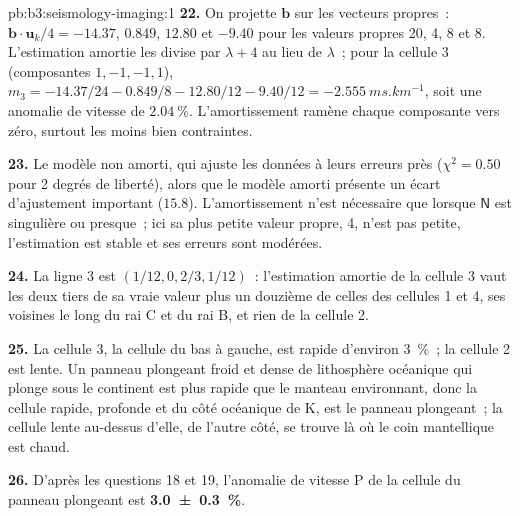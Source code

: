 \begin{solution}{pb:b3:seismology-imaging:1}
\textbf{22.} On projette $\mathbf b$ sur les vecteurs propres~: $\mathbf b\cdot\mathbf u_k/4
= -14.37$, $0.849$, $12.80$ et $-9.40$ pour les valeurs propres 20, 4, 8 et 8.
L'estimation amortie les divise par $\lambda + 4$ au lieu de $\lambda$~; pour
la cellule 3 (composantes $1, -1, -1, 1$),
$m_3 = -14.37/24 - 0.849/8 - 12.80/12 - 9.40/12 = \qty{-2.555}{ms.km^{-1}}$,
soit une anomalie de vitesse de $\qty{+2.04}{\percent}$. L'amortissement ramène chaque composante
vers zéro, surtout les moins bien contraintes.

\textbf{23.} Le modèle non amorti, qui ajuste les données à leurs erreurs près
($\chi^2 = 0.50$ pour 2 degrés de liberté), alors que le modèle amorti présente
un écart d'ajustement important ($15.8$). L'amortissement n'est nécessaire que lorsque $\mathsf N$ est singulière ou
presque~; ici sa plus petite valeur propre, 4, n'est pas petite, l'estimation est stable et
ses erreurs sont modérées.

\textbf{24.} La ligne 3 est $(1/12, 0, 2/3, 1/12)$~: l'estimation amortie de la cellule 3 vaut
les deux tiers de sa vraie valeur plus un douzième de celles des cellules 1 et 4, ses voisines
le long du rai C et du rai B, et rien de la cellule 2.

\textbf{25.} La cellule 3, la cellule du bas à gauche, est rapide
d'environ \qty{3}{\percent}~; la cellule 2 est lente. Un panneau plongeant froid et dense de lithosphère océanique
qui plonge sous le continent est plus rapide que le manteau environnant, donc la
cellule rapide, profonde et du côté océanique de K, est le panneau plongeant~; la cellule lente au-dessus
d'elle, de l'autre côté, se trouve là où le coin mantellique est chaud.

\textbf{26.} D'après les questions 18 et 19, l'anomalie de vitesse P de la cellule du panneau plongeant est
\textbf{\qty[text-series-to-math=true, uncertainty-mode=separate]{3.0 \pm 0.3}{\percent}}.
\end{solution}
